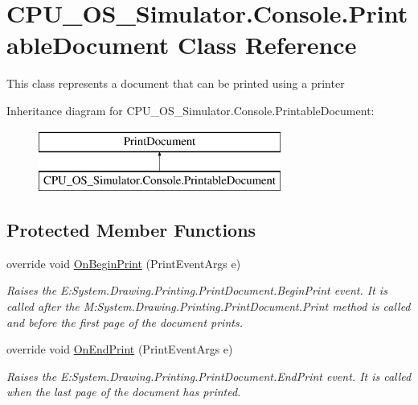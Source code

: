 \hypertarget{class_c_p_u___o_s___simulator_1_1_console_1_1_printable_document}{}\section{C\+P\+U\+\_\+\+O\+S\+\_\+\+Simulator.\+Console.\+Printable\+Document Class Reference}
\label{class_c_p_u___o_s___simulator_1_1_console_1_1_printable_document}


This class represents a document that can be printed using a printer  


Inheritance diagram for C\+P\+U\+\_\+\+O\+S\+\_\+\+Simulator.\+Console.\+Printable\+Document\+:\begin{figure}[H]
\begin{center}
\leavevmode
\includegraphics[height=2.000000cm]{class_c_p_u___o_s___simulator_1_1_console_1_1_printable_document}
\end{center}
\end{figure}
\subsection*{Protected Member Functions}
\begin{DoxyCompactItemize}
\item 
override void \hyperlink{class_c_p_u___o_s___simulator_1_1_console_1_1_printable_document_a63d8f6a5ee9648e418dbc93859d2c746}{On\+Begin\+Print} (Print\+Event\+Args e)
\begin{DoxyCompactList}\small\item\em Raises the E\+:\+System.\+Drawing.\+Printing.\+Print\+Document.\+Begin\+Print event. It is called after the M\+:\+System.\+Drawing.\+Printing.\+Print\+Document.\+Print method is called and before the first page of the document prints. \end{DoxyCompactList}\item 
override void \hyperlink{class_c_p_u___o_s___simulator_1_1_console_1_1_printable_document_a3e2f3a86ac5c236c3c36a04910fb6ab1}{On\+End\+Print} (Print\+Event\+Args e)
\begin{DoxyCompactList}\small\item\em Raises the E\+:\+System.\+Drawing.\+Printing.\+Print\+Document.\+End\+Print event. It is called when the last page of the document has printed. \end{DoxyCompactList}\end{DoxyCompactItemize}
